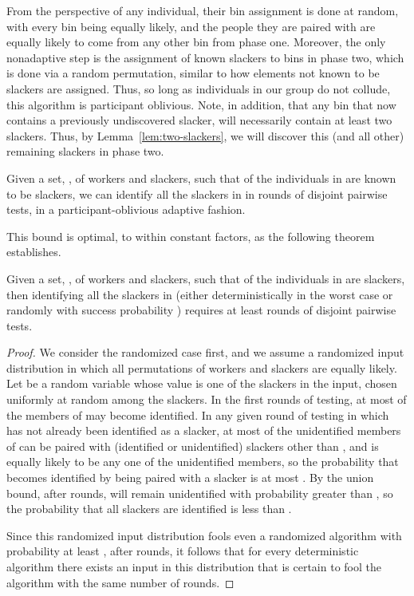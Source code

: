 \documentclass[11pt]{llncs}
\begin{document}
From the perspective of any individual, their bin
assignment 
is done at random, with every bin being equally likely, and the people they are paired with are equally likely to come from any other bin from phase one.
Moreover, the only nonadaptive step is the assignment of known slackers to
bins in phase two, which is done via a random permutation, similar to how
elements not known to be slackers are assigned.
Thus, so long as individuals in our group do not collude, this algorithm is
participant oblivious.
Note, in addition, that any bin that now contains a previously undiscovered
slacker, will necessarily contain at least two slackers.
Thus, by Lemma~\ref{lem:two-slackers},
we will discover this (and all other) remaining slackers in phase two.

\begin{theorem}
Given a set, , of  workers and slackers, such that  of the
individuals in  are known to be slackers, 
we can identify all the slackers in 
in  rounds of disjoint pairwise tests, in a participant-oblivious adaptive fashion. 
\end{theorem}

This bound is optimal, to within constant factors, as the following
theorem establishes.

\begin{theorem}
Given a set, , of  workers and slackers, such that  of the
individuals in  are slackers, then identifying all the slackers in  (either deterministically in the worst case or randomly with success probability )
requires at least
 rounds of disjoint pairwise tests.
\end{theorem}

\begin{proof}
We consider the randomized case first, and we assume a randomized input distribution in which all permutations of workers and slackers are equally likely. Let  be a random variable whose value is one of the slackers in the input, chosen uniformly at random among the slackers. In the first  rounds of testing, at most  of the members of  may become identified.
 In any given round of testing in which  has not already been identified as a slacker, at most  of the unidentified members of  can be paired with (identified or unidentified) slackers other than , and  is equally likely to be any one of the  unidentified members,  so the probability that  becomes identified by being paired with a slacker is at most . By the union bound, after  rounds,  will remain unidentified with probability greater than , so the probability that all slackers are identified is less than .

Since this randomized input distribution fools even a randomized algorithm with probability at least , after  rounds, it follows that for every deterministic algorithm there exists an input in this distribution that is certain to fool the algorithm with the same number of rounds. 
\end{proof}
\end{document}
